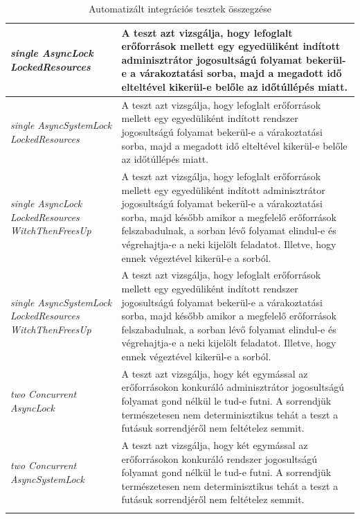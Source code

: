 \begin{center}
\begin{longtable}{ | p{} | p{} | }
		\emph{single AsyncLock LockedResources} &
		A teszt azt vizsgálja, hogy lefoglalt erőforrások mellett egy egyedüliként indított adminisztrátor jogosultságú folyamat bekerül-e a várakoztatási sorba, majd a megadott idő elteltével kikerül-e belőle az időtúllépés miatt.
		\\ \hline
		
		\emph{single AsyncSystemLock LockedResources} &
		A teszt azt vizsgálja, hogy lefoglalt erőforrások mellett egy egyedüliként indított rendszer jogosultságú folyamat bekerül-e a várakoztatási sorba, majd a megadott idő elteltével kikerül-e belőle az időtúllépés miatt.
		\\ \hline
		
		\emph{single AsyncLock LockedResources WitchThenFreesUp} &
		A teszt azt vizsgálja, hogy lefoglalt erőforrások mellett egy egyedüliként indított adminisztrátor jogosultságú folyamat bekerül-e a várakoztatási sorba, majd később amikor a megfelelő erőforrások felszabadulnak, a sorban lévő folyamat elindul-e és végrehajtja-e a neki kijelölt feladatot. Illetve, hogy ennek végeztével kikerül-e a sorból.
		\\ \hline
		
		\emph{single AsyncSystemLock LockedResources WitchThenFreesUp} &
		A teszt azt vizsgálja, hogy lefoglalt erőforrások mellett egy egyedüliként indított rendszer jogosultságú folyamat bekerül-e a várakoztatási sorba, majd később amikor a megfelelő erőforrások felszabadulnak, a sorban lévő folyamat elindul-e és végrehajtja-e a neki kijelölt feladatot. Illetve, hogy ennek végeztével kikerül-e a sorból.
		\\ \hline

		\emph{two Concurrent AsyncLock} &
		A teszt azt vizsgálja, hogy két egymással az erőforrásokon konkuráló adminisztrátor jogosultságú folyamat gond nélkül le tud-e futni. A sorrendjük természetesen nem determinisztikus tehát a teszt a futásuk sorrendjéről nem feltételez semmit.
		\\ \hline

  	\emph{two Concurrent AsyncSystemLock} &
		A teszt azt vizsgálja, hogy két egymással az erőforrásokon konkuráló rendszer jogosultságú folyamat gond nélkül le tud-e futni. A sorrendjük természetesen nem determinisztikus tehát a teszt a futásuk sorrendjéről nem feltételez semmit.
		\\ \hline
  
		\caption{Automatizált integrációs tesztek összegzése}
		\label{tab:example-3}		
	\end{longtable}
\end{center}